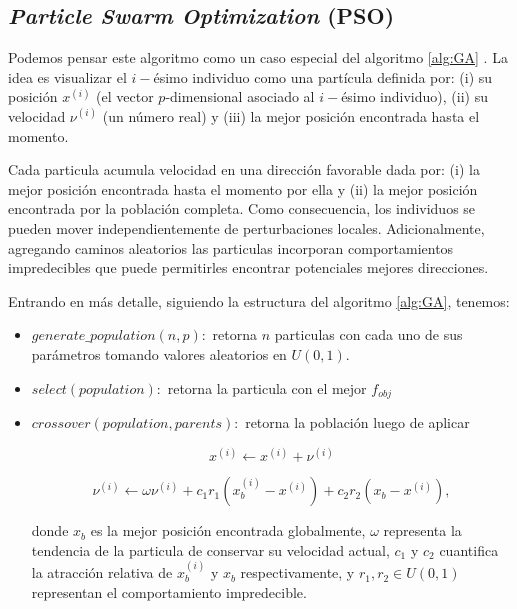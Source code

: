 \subsection{\emph{Particle Swarm Optimization} (PSO)}

Podemos pensar este algoritmo como un caso especial del algoritmo \ref{alg:GA}
\citep{Mykel2019, Prosopio-Galarza2019}.
La idea es visualizar el $i-$ésimo individuo como una partícula definida por: 
(i) su posición $x^{(i)}$ (el vector $p$-dimensional asociado al $i-$ésimo individuo),
(ii) su velocidad $\nu^{(i)}$ (un número real) y
(iii) la mejor posición encontrada hasta el momento.

Cada particula acumula velocidad en una dirección favorable dada por: 
(i) la mejor posición encontrada hasta el momento por ella y 
(ii) la mejor posición encontrada por la población completa.
Como consecuencia, los individuos se pueden mover independientemente de
perturbaciones locales.
Adicionalmente, agregando caminos aleatorios las particulas incorporan
comportamientos impredecibles que puede permitirles encontrar potenciales
mejores direcciones.

Entrando en más detalle, siguiendo la estructura del algoritmo \ref{alg:GA}, tenemos:

\begin{itemize}

\item $generate\_population(n, p):$ retorna $n$ particulas con cada uno de
      sus parámetros tomando valores aleatorios en $U(0, 1)$.

\item $select(population):$ retorna la particula con el mejor $f_{obj}$

\item $crossover(population, parents):$ retorna la población luego de aplicar 
    
  \begin{equation}
    x^{(i)} \gets x^{(i)} + \nu^{(i)}
  \label{pso-pos}
  \end{equation}

  \begin{equation}
    \nu^{(i)} \gets \omega \nu^{(i)} + c_1 r_1 \left(x_{b}^{(i)} - x^{(i)}
    \right) + c_2 r_2 \left(x_{b} - x^{(i)} \right),
  \label{pso-speed}
  \end{equation}
    

  donde $x_{b}$  es la mejor posición encontrada globalmente, 
  $\omega$ representa la tendencia de la particula de conservar su velocidad actual,
  $c_1$ y $c_2$ cuantifica la atracción relativa de $x_{b}^{(i)}$ y $x_{b}$ respectivamente, 
  y $r_1, r_2 \in U(0, 1)$ representan el comportamiento impredecible.

\end{itemize}


